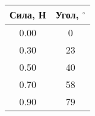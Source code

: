 \begin{tabular}{|c|c|}
\hline
Сила, Н & Угол, $^\circ$ \\ \hline
0.00 & 0 \\ \hline
0.30 & 23 \\ \hline
0.50 & 40 \\ \hline
0.70 & 58 \\ \hline
0.90 & 79 \\ \hline
\end{tabular}
